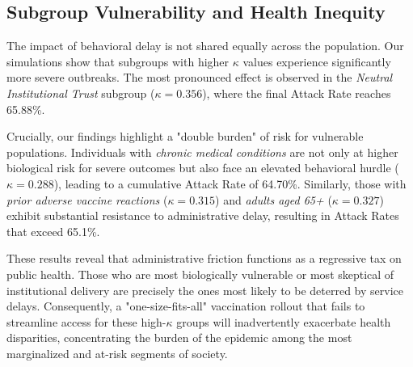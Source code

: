 \subsection{Subgroup Vulnerability and Health Inequity}

The impact of behavioral delay is not shared equally across the population. Our simulations show that subgroups with higher $\kappa$ values experience significantly more severe outbreaks. The most pronounced effect is observed in the \textit{Neutral Institutional Trust} subgroup ($\kappa = 0.356$), where the final Attack Rate reaches 65.88\%. 

Crucially, our findings highlight a "double burden" of risk for vulnerable populations. Individuals with \textit{chronic medical conditions} are not only at higher biological risk for severe outcomes but also face an elevated behavioral hurdle ($\kappa = 0.288$), leading to a cumulative Attack Rate of 64.70\%. Similarly, those with \textit{prior adverse vaccine reactions} ($\kappa = 0.315$) and \textit{adults aged 65+} ($\kappa = 0.327$) exhibit substantial resistance to administrative delay, resulting in Attack Rates that exceed 65.1\%. 

These results reveal that administrative friction functions as a regressive tax on public health. Those who are most biologically vulnerable or most skeptical of institutional delivery are precisely the ones most likely to be deterred by service delays. Consequently, a "one-size-fits-all" vaccination rollout that fails to streamline access for these high-$\kappa$ groups will inadvertently exacerbate health disparities, concentrating the burden of the epidemic among the most marginalized and at-risk segments of society.
